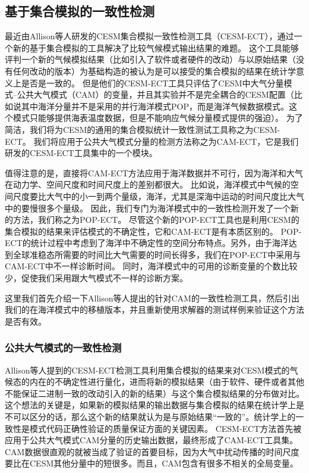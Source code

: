 \subsection{基于集合模拟的一致性检测}
\label{verify:enseble}

最近由Allison等人\cite{baker2015}研发的CESM集合模拟一致性检测工具（CESM-ECT），通过一个新的基于集合模拟的工具解决了比较气候模式输出结果的难题。 
这个工具能够评判一个新的气候模拟结果（比如引入了软件或者硬件的改动）与以原始结果（没有任何改动的版本）为基础构造的被认为是可以接受的集合模拟的结果在统计学意义上是否是一致的。 
但是他们的CESM-ECT工具只评估了CESM中大气分量模式--公共大气模式（CAM）的变量，并且其实验并不是完全耦合的CESM配置（比如说其中海洋分量并不是采用的并行海洋模式POP，而是海洋气候数据模式。这个模式只能够提供海表温度数据，但是不能响应气候分量模式提供的强迫）。 
为了简洁，我们将为CESM的通用的集合模拟统计一致性测试工具称之为CESM-ECT。 
我们将应用于公共大气模式分量的检测方法称之为CAM-ECT，它是我们研发的CESM-ECT工具集中的一个模块。 

值得注意的是，直接将CAM-ECT方法应用于海洋数据并不可行，因为海洋和大气在动力学、空间尺度和时间尺度上的差别都很大。
比如说，海洋模式中气候的空间尺度要比大气中的小一到两个量级，海洋，尤其是深海中运动的时间尺度比大气中的要慢很多个量级。
因此，我们专门为海洋模式中的一致性检测开发了一个新的方法，我们称之为POP-ECT。 
尽管这个新的POP-ECT工具也是利用CESM的集合模拟的结果来评估模式的不确定性，它和CAM-ECT是有本质区别的。 
POP-ECT的统计过程中考虑到了海洋中不确定性的空间分布特点。另外，由于海洋达到全球准稳态所需要的时间比大气需要的时间长得多，我们在POP-ECT中采用与CAM-ECT中不一样诊断时间。 
同时，海洋模式中的可用的诊断变量的个数比较少，促使我们采用跟大气模式不一样的诊断方案。 

这里我们首先介绍一下Allison等人提出的针对CAM的一致性检测工具，然后引出我们的在海洋模式中的移植版本，并且重新使用求解器的测试样例来验证这个方法是否有效。

\subsubsection{公共大气模式的一致性检测 }
\label{verify:CAM}
Allison等人\cite{baker2015}提到的CESM-ECT检测工具利用集合模拟的结果来对CESM模式的气候态的内在的不确定性进行量化，进而将新的模拟结果（由于软件、硬件或者其他不能保证二进制一致的改动引入的新的结果）与这个集合模拟结果的分布做对比。
这个想法的关键是，如果新的模拟结果的输出数据与集合模拟的结果在统计学上是不可以区分的话，那么这个新的结果就认为是与原始结果“一致的”。统计学上的一致性是模式代码正确性验证的质量保证方面的关键因素\cite{oberkampf2010}。
CESM-ECT方法首先被应用于公共大气模式CAM分量的历史输出数据，最终形成了CAM-ECT工具集。
CAM数据很直观的就被当成了验证的首要目标，因为大气中扰动传播的时间尺度要比在CESM其他分量中的短很多。而且，CAM包含有很多不相关的全局变量。 


